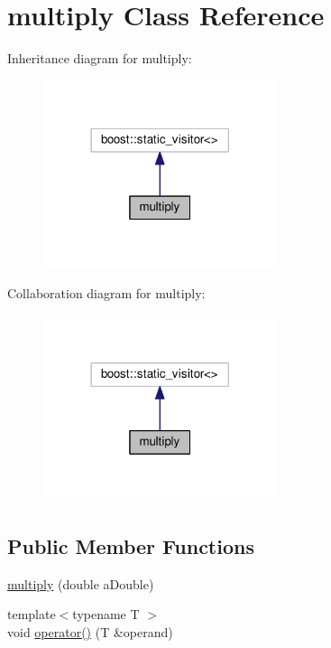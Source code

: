 \hypertarget{classmultiply}{}\section{multiply Class Reference}
\label{classmultiply}


Inheritance diagram for multiply\+:\nopagebreak
\begin{figure}[H]
\begin{center}
\leavevmode
\includegraphics[width=194pt]{classmultiply__inherit__graph}
\end{center}
\end{figure}


Collaboration diagram for multiply\+:\nopagebreak
\begin{figure}[H]
\begin{center}
\leavevmode
\includegraphics[width=194pt]{classmultiply__coll__graph}
\end{center}
\end{figure}
\subsection*{Public Member Functions}
\begin{DoxyCompactItemize}
\item 
\hyperlink{classmultiply_a30dc2fc906aa297217f8696cc37958a3}{multiply} (double a\+Double)
\item 
{\footnotesize template$<$typename T $>$ }\\void \hyperlink{classmultiply_aca475ee5ee62c274369f8623cc914c28}{operator()} (T \&operand)
\end{DoxyCompactItemize}
